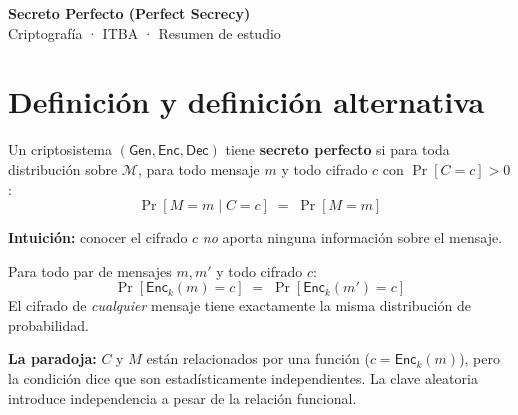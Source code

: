 \documentclass[11pt,a4paper]{article}
\begin{document}
\color{darkText}

\begin{tcolorbox}[
  enhanced, arc=6pt, boxrule=0pt,
  colback=darkText, coltext=white,
  left=12pt, right=12pt, top=10pt, bottom=10pt
]
  {\Large\bfseries Secreto Perfecto (Perfect Secrecy)}\\[4pt]
  {\small Criptografía · ITBA · Resumen de estudio}
\end{tcolorbox}

\vspace{6pt}
\tableofcontents
\vspace{10pt}

\section{Definición y definición alternativa}

\begin{tcolorbox}[defstyle, title={Definición: Secreto perfecto (Shannon)}]
Un criptosistema $(\mathsf{Gen}, \mathsf{Enc}, \mathsf{Dec})$ tiene \textbf{secreto perfecto} si para toda distribución sobre $\mathcal{M}$, para todo mensaje $m$ y todo cifrado $c$ con $\Pr[C{=}c]>0$:
\[
  \Pr[M{=}m \mid C{=}c] \;=\; \Pr[M{=}m]
\]
\end{tcolorbox}

\begin{tcolorbox}[memostyle]
\textbf{Intuición:} conocer el cifrado $c$ \emph{no} aporta ninguna información sobre el mensaje.
\end{tcolorbox}

\medskip
\begin{tcolorbox}[defstyle, title={Definición alternativa (equivalente, por encripción)}]
Para todo par de mensajes $m, m'$ y todo cifrado $c$:
\[
  \Pr[\mathsf{Enc}_k(m) = c] \;=\; \Pr[\mathsf{Enc}_k(m') = c]
\]
El cifrado de \emph{cualquier} mensaje tiene exactamente la misma distribución de probabilidad.
\end{tcolorbox}

\medskip
\begin{tcolorbox}[memostyle]
\textbf{La paradoja:} $C$ y $M$ están relacionados por una función ($c = \mathsf{Enc}_k(m)$), pero la condición dice que son estadísticamente independientes. La clave aleatoria introduce independencia a pesar de la relación funcional.
\end{tcolorbox}
\end{document}
